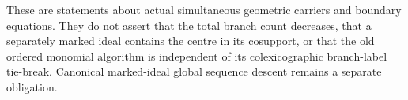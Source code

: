 \begin{remark}
These are statements about actual simultaneous geometric carriers and
boundary equations. They do not assert that the total branch count
decreases, that a separately marked ideal contains the centre in its
cosupport, or that the old ordered monomial algorithm is independent
of its colexicographic branch-label tie-break. Canonical marked-ideal
global sequence descent remains a separate obligation.
\end{remark}
